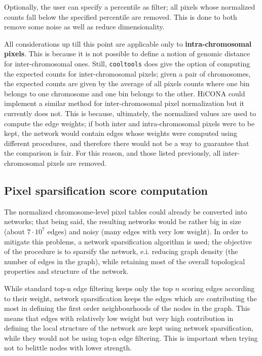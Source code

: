 Optionally, the user can specify a percentile as filter; all pixels whose normalized counts fall below the specified percentile are removed. This is done to both remove some noise as well as reduce dimensionality. 
 
All considerations up till this point are applicable only to \textbf{intra-chromosomal pixels}. This is because it is not possible to define a notion of genomic distance for inter-chromosomal ones. Still, \texttt{cooltools} does give the option of computing the expected counts for inter-chromosomal pixels; given a pair of chromosomes, the expected counts are given by the average of all pixels counts where one bin belongs to one chromosome and one bin belongs to the other. HiCONA could implement a similar method for inter-chromosomal pixel normalization but it currently does not. This is because, ultimately, the normalized values are used to compute the edge weights; if both inter and intra-chromosomal pixels were to be kept, the network would contain edges whose weights were computed using different procedures, and therefore there would not be a way to guarantee that the comparison is fair. For this reason, and those listed previously, all inter-chromosomal pixels are removed.

\subsection{Pixel sparsification score computation}\label{par:sparscore}

The normalized chromosome-level pixel tables could already be converted into networks; that being said, the resulting networks would be rather big in size (about $7 \cdot 10^7$ edges) and noisy (many edges with very low weight). In order to mitigate this problems, a network sparsification algorithm\cite{sparsification2009} is used; the objective of the procedure is to sparsify the network, e.i. reducing graph density (the number of edges in the graph), while retaining most of the overall topological properties and structure of the network.

While standard top-n edge filtering keeps only the top $n$ scoring edges according to their weight, network sparsification keeps the edges which are contributing the most in defining the first order neighbourhoods of the nodes in the graph. This means that edges with relatively low weight but very high contribution in defining the local structure of the network are kept using network sparsification, while they would not be using top-n edge filtering. This is important when trying not to belittle nodes with lower strength.

